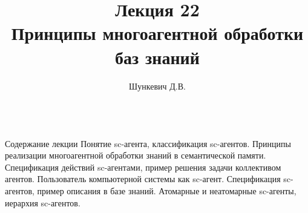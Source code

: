 \title{Лекция 22\\Принципы многоагентной обработки баз знаний}
\author[]{Шункевич Д.В.}

\begin{frame}
	\titlepage
\end{frame}

\begin{frame}{\\Содержание лекции}
	\topline
	\justifying
	Понятие sc-агента, классификация sc-агентов. Принципы реализации многоагентной обработки знаний в семантической памяти. Спецификация действий sc-агентами, пример решения задачи коллективом агентов. Пользователь компьютерной системы как sc-агент. Спецификация sc-агентов, пример описания в базе знаний. Атомарные и неатомарные sc-агенты, иерархия sc-агентов.
\end{frame}